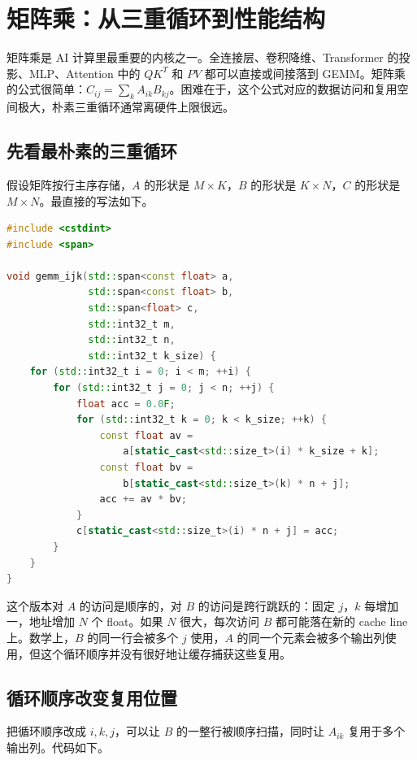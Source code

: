 \chapter{矩阵乘：从三重循环到性能结构}

矩阵乘是 AI 计算里最重要的内核之一。全连接层、卷积降维、Transformer 的投影、MLP、Attention 中的 $QK^T$ 和 $PV$ 都可以直接或间接落到 GEMM。矩阵乘的公式很简单：$C_{ij} = \sum_k A_{ik}B_{kj}$。困难在于，这个公式对应的数据访问和复用空间极大，朴素三重循环通常离硬件上限很远。

\section{先看最朴素的三重循环}

假设矩阵按行主序存储，$A$ 的形状是 $M \times K$，$B$ 的形状是 $K \times N$，$C$ 的形状是 $M \times N$。最直接的写法如下。

\begin{lstlisting}[language=C++,caption={朴素 GEMM：按 i、j、k 顺序计算}]
#include <cstdint>
#include <span>

void gemm_ijk(std::span<const float> a,
              std::span<const float> b,
              std::span<float> c,
              std::int32_t m,
              std::int32_t n,
              std::int32_t k_size) {
    for (std::int32_t i = 0; i < m; ++i) {
        for (std::int32_t j = 0; j < n; ++j) {
            float acc = 0.0F;
            for (std::int32_t k = 0; k < k_size; ++k) {
                const float av =
                    a[static_cast<std::size_t>(i) * k_size + k];
                const float bv =
                    b[static_cast<std::size_t>(k) * n + j];
                acc += av * bv;
            }
            c[static_cast<std::size_t>(i) * n + j] = acc;
        }
    }
}
\end{lstlisting}

这个版本对 $A$ 的访问是顺序的，对 $B$ 的访问是跨行跳跃的：固定 $j$，$k$ 每增加一，地址增加 $N$ 个 float。如果 $N$ 很大，每次访问 $B$ 都可能落在新的 cache line 上。数学上，$B$ 的同一行会被多个 $j$ 使用，$A$ 的同一个元素会被多个输出列使用，但这个循环顺序并没有很好地让缓存捕获这些复用。

\section{循环顺序改变复用位置}

把循环顺序改成 $i,k,j$，可以让 $B$ 的一整行被顺序扫描，同时让 $A_{ik}$ 复用于多个输出列。代码如下。

